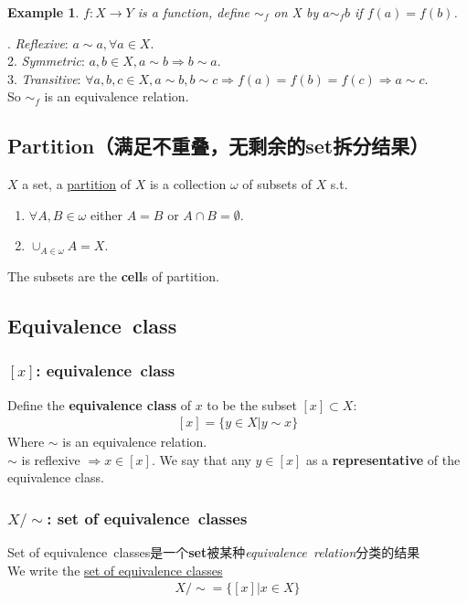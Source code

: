 \documentclass[11pt,a4paper]{article}
\newtheorem{example}{Example}
\begin{document}
\begin{example}
    $f:X \rightarrow Y$ is a function, define $\sim_f$ on X by $a\sim_f b$ if $f(a)=f(b)$.
\end{example}
. \textit{Reflexive}: $a\sim a, \forall a\in X$.\\
2. \textit{Symmetric}: $a,b\in X ,a\sim b\Rightarrow b\sim a$.\\
3. \textit{Transitive}: $\forall a,b,c\in X ,a\sim b, b\sim c \Rightarrow f(a)=f(b)=f(c) \Rightarrow a\sim c$.\\
So $\sim_f$ is an equivalence relation.
\subsection{Partition（满足不重叠，无剩余的set拆分结果）}
$X$ a set, a \underline{partition} of $X$ is a collection $\omega$ of subsets of $X$ s.t.
\begin{enumerate}[1)]
    \item $\forall A,B\in\omega$ either $A=B$ or $A\cap B=\emptyset$.
    \item $\cup_{A\in\omega}A=X$.
\end{enumerate}
The subsets are the \textbf{cell}s of partition.

\subsection{Equivalence class}
\subsubsection{$[x]$: equivalence class}
Define the \textbf{equivalence class} of $x$ to be the subset $[x]\subset X$:
\begin{equation}
    \begin{aligned}
        [x]=\{ y\in X| y\sim x\}
    \end{aligned}
    \nonumber
\end{equation}
Where $\sim$ is an equivalence relation.\\
$\sim$ is reflexive $\Rightarrow x\in[x]$. We say that any $y\in[x]$ as a \textbf{representative} of the equivalence class.\\
\subsubsection{$X/\sim$: set of equivalence classes}
Set of equivalence classes是一个\textbf{set}被某种\textit{equivalence relation}分类的结果\\
We write the \underline{set of equivalence classes}
\begin{equation}
    \begin{aligned}
        X/\sim= \{[x]|x\in X \}
    \end{aligned}
    \nonumber
\end{equation}
\end{document}
